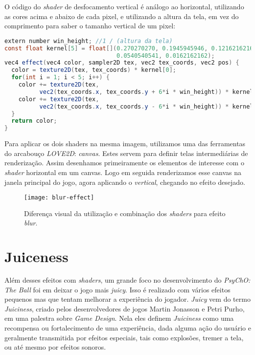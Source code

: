 O código do \textit{shader} de desfocamento vertical é análogo ao horizontal, utilizando as cores acima e abaixo de cada pixel, e utilizando a altura da tela, em vez do comprimento para saber o tamanho vertical de um pixel:

\begin{lstlisting}[language=java]
extern number win_height; //1 / (altura da tela)
const float kernel[5] = float[](0.270270270, 0.1945945946, 0.1216216216,
                                0.0540540541, 0.0162162162);
vec4 effect(vec4 color, sampler2D tex, vec2 tex_coords, vec2 pos) {
  color = texture2D(tex, tex_coords) * kernel[0];
  for(int i = 1; i < 5; i++) {
    color += texture2D(tex,
          vec2(tex_coords.x, tex_coords.y + 6*i * win_height)) * kernel[i];
    color += texture2D(tex,
          vec2(tex_coords.x, tex_coords.y - 6*i * win_height)) * kernel[i];
  }
  return color;
}
\end{lstlisting}

Para aplicar os dois shaders na mesma imagem, utilizamos uma das ferramentas do arcabouço \textit{LOVE2D}: \textit{canvas}. Estes servem para definir telas intermediárias de renderização. Assim desenhamos primeiramente os elementos de interesse com o \textit{shader} horizontal em um canvas. Logo em seguida renderizamos esse canvas na janela principal do jogo, agora aplicando o \textit{vertical}, chegando no efeito desejado.

\begin{figure}[h!]
\texttt{[image: blur-effect]}
\centering
\caption{Diferença visual da utilização e combinação dos \textit{shaders} para efeito \textit{blur}.}
\end{figure}


\section{Juiceness}
\label{sec:juiceness}

Além desses efeitos com \textit{shaders}, um grande foco no desenvolvimento do \textit{PsyChO: The Ball} foi em deixar o jogo mais \textit{juicy}. Isso é realizado com vários efeitos pequenos mas que tentam melhorar a experiência do jogador. \textit{Juicy} vem do termo \textit{Juiciness}, criado pelos desenvolvedores de jogos Martin Jonasson e Petri Purho, em uma palestra sobre \textit{Game Design}\cite{martinpetri}. Nela eles definem \textit{Juiciness} como uma recompensa ou fortalecimento de uma experiência, dada alguma ação do usuário e geralmente transmitida por efeitos especiais, tais como explosões, tremer a tela, ou até mesmo por efeitos sonoros.

